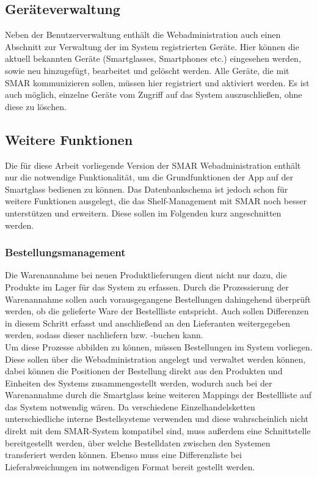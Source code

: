 \subsection{Geräteverwaltung}
Neben der Benutzerverwaltung enthält die Webadministration auch einen Abschnitt zur Verwaltung der im System registrierten Geräte. Hier können die aktuell bekannten Geräte (Smartglasses, Smartphones etc.) eingesehen werden, sowie neu hinzugefügt, bearbeitet und gelöscht werden. Alle Geräte, die mit \acs{SMAR} kommunizieren sollen, müssen hier registriert und aktiviert werden. Es ist auch möglich, einzelne Geräte vom Zugriff auf das System auszuschließen, ohne diese zu löschen.

\subsection{Weitere Funktionen}
Die für diese Arbeit vorliegende Version der \acs{SMAR} Webadministration enthält nur die notwendige Funktionalität, um die Grundfunktionen der App auf der Smartglass bedienen zu können. Das Datenbankschema ist jedoch schon für weitere Funktionen ausgelegt, die das Shelf-Management mit \acs{SMAR} noch besser unterstützen und erweitern. Diese sollen im Folgenden kurz angeschnitten werden.

\subsubsection{Bestellungsmanagement}
Die Warenannahme bei neuen Produktlieferungen dient nicht nur dazu, die Produkte im Lager für das System zu erfassen. Durch die Prozessierung der Warenannahme sollen auch vorausgegangene Bestellungen dahingehend überprüft werden, ob die gelieferte Ware der Bestellliste entspricht. Auch sollen Differenzen in diesem Schritt erfasst und anschließend an den Lieferanten weitergegeben werden, sodass dieser nachliefern bzw. -buchen kann.\\

Um diese Prozesse abbilden zu können, müssen Bestellungen im System vorliegen. Diese sollen über die Webadministration angelegt und verwaltet werden können, dabei können die Positionen der Bestellung direkt aus den Produkten und Einheiten des Systems zusammengestellt werden, wodurch auch bei der Warenannahme durch die Smartglass keine weiteren Mappings der Bestellliste auf das System notwendig wären. Da verschiedene Einzelhandelsketten unterschiedliche interne Bestellsysteme verwenden und diese wahrscheinlich nicht direkt mit dem \acs{SMAR}-System kompatibel sind, muss außerdem eine Schnittstelle bereitgestellt werden, über welche Bestelldaten zwischen den Systemen transferiert werden können. Ebenso muss eine Differenzliste bei Lieferabweichungen im notwendigen Format bereit gestellt werden.\\

